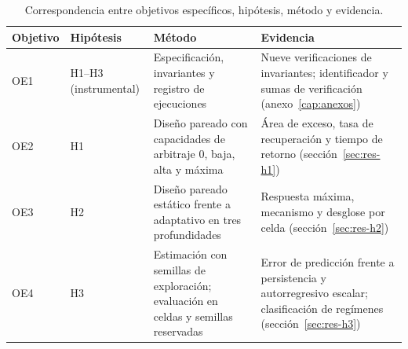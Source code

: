 \begin{table}[htbp]
\centering
\caption{Correspondencia entre objetivos específicos, hipótesis, método y evidencia.}
\label{tab:oe-h}
\small
\begin{tabularx}{\textwidth}{@{}l l >{\raggedright\arraybackslash}X >{\raggedright\arraybackslash}X@{}}
\toprule
Objetivo & Hipótesis & Método & Evidencia \\
\midrule
OE1 & H1--H3 (instrumental) & Especificación, invariantes y registro de ejecuciones & Nueve verificaciones de invariantes; identificador y sumas de verificación (anexo~\ref{cap:anexos}) \\
OE2 & H1 & Diseño pareado con capacidades de arbitraje 0, baja, alta y máxima & Área de exceso, tasa de recuperación y tiempo de retorno (sección~\ref{sec:res-h1}) \\
OE3 & H2 & Diseño pareado estático frente a adaptativo en tres profundidades & Respuesta máxima, mecanismo y desglose por celda (sección~\ref{sec:res-h2}) \\
OE4 & H3 & Estimación con semillas de exploración; evaluación en celdas y semillas reservadas & Error de predicción frente a persistencia y autorregresivo escalar; clasificación de regímenes (sección~\ref{sec:res-h3}) \\
\bottomrule
\end{tabularx}
\end{table}
